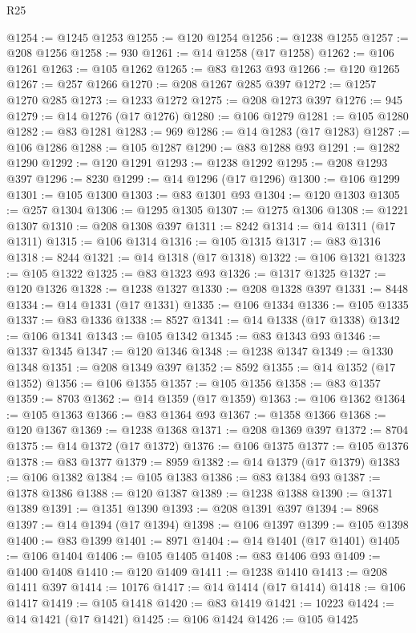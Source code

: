 \begin{lexlean}{R25}
\begin{coremodule}
@1254 := @1245 @1253
@1255 := @120 @1254
@1256 := @1238 @1255
@1257 := @208 @1256
@1258 := 930
@1261 := @14 @1258 (@17 @1258)
@1262 := @106 @1261
@1263 := @105 @1262
@1265 := @83 @1263 @93
@1266 := @120 @1265
@1267 := @257 @1266
@1270 := @208 @1267 @285 @397
@1272 := @1257 @1270 @285
@1273 := @1233 @1272
@1275 := @208 @1273 @397
@1276 := 945
@1279 := @14 @1276 (@17 @1276)
@1280 := @106 @1279
@1281 := @105 @1280
@1282 := @83 @1281
@1283 := 969
@1286 := @14 @1283 (@17 @1283)
@1287 := @106 @1286
@1288 := @105 @1287
@1290 := @83 @1288 @93
@1291 := @1282 @1290
@1292 := @120 @1291
@1293 := @1238 @1292
@1295 := @208 @1293 @397
@1296 := 8230
@1299 := @14 @1296 (@17 @1296)
@1300 := @106 @1299
@1301 := @105 @1300
@1303 := @83 @1301 @93
@1304 := @120 @1303
@1305 := @257 @1304
@1306 := @1295 @1305
@1307 := @1275 @1306
@1308 := @1221 @1307
@1310 := @208 @1308 @397
@1311 := 8242
@1314 := @14 @1311 (@17 @1311)
@1315 := @106 @1314
@1316 := @105 @1315
@1317 := @83 @1316
@1318 := 8244
@1321 := @14 @1318 (@17 @1318)
@1322 := @106 @1321
@1323 := @105 @1322
@1325 := @83 @1323 @93
@1326 := @1317 @1325
@1327 := @120 @1326
@1328 := @1238 @1327
@1330 := @208 @1328 @397
@1331 := 8448
@1334 := @14 @1331 (@17 @1331)
@1335 := @106 @1334
@1336 := @105 @1335
@1337 := @83 @1336
@1338 := 8527
@1341 := @14 @1338 (@17 @1338)
@1342 := @106 @1341
@1343 := @105 @1342
@1345 := @83 @1343 @93
@1346 := @1337 @1345
@1347 := @120 @1346
@1348 := @1238 @1347
@1349 := @1330 @1348
@1351 := @208 @1349 @397
@1352 := 8592
@1355 := @14 @1352 (@17 @1352)
@1356 := @106 @1355
@1357 := @105 @1356
@1358 := @83 @1357
@1359 := 8703
@1362 := @14 @1359 (@17 @1359)
@1363 := @106 @1362
@1364 := @105 @1363
@1366 := @83 @1364 @93
@1367 := @1358 @1366
@1368 := @120 @1367
@1369 := @1238 @1368
@1371 := @208 @1369 @397
@1372 := 8704
@1375 := @14 @1372 (@17 @1372)
@1376 := @106 @1375
@1377 := @105 @1376
@1378 := @83 @1377
@1379 := 8959
@1382 := @14 @1379 (@17 @1379)
@1383 := @106 @1382
@1384 := @105 @1383
@1386 := @83 @1384 @93
@1387 := @1378 @1386
@1388 := @120 @1387
@1389 := @1238 @1388
@1390 := @1371 @1389
@1391 := @1351 @1390
@1393 := @208 @1391 @397
@1394 := 8968
@1397 := @14 @1394 (@17 @1394)
@1398 := @106 @1397
@1399 := @105 @1398
@1400 := @83 @1399
@1401 := 8971
@1404 := @14 @1401 (@17 @1401)
@1405 := @106 @1404
@1406 := @105 @1405
@1408 := @83 @1406 @93
@1409 := @1400 @1408
@1410 := @120 @1409
@1411 := @1238 @1410
@1413 := @208 @1411 @397
@1414 := 10176
@1417 := @14 @1414 (@17 @1414)
@1418 := @106 @1417
@1419 := @105 @1418
@1420 := @83 @1419
@1421 := 10223
@1424 := @14 @1421 (@17 @1421)
@1425 := @106 @1424
@1426 := @105 @1425

\end{coremodule}
\end{lexlean}
